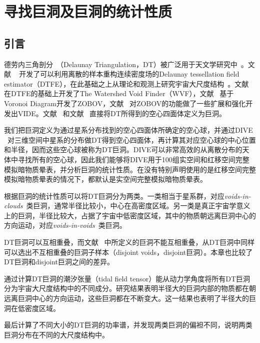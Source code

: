 \chapter{寻找巨洞及巨洞的统计性质}
\label{cha:DIVE}

\section{引言}

德劳内三角剖分~\cite{Delaunay1934}（Delaunay Triangulation，DT）被广泛用于天文学研究中~\cite{Bernardeau1996,Marinoni2002,Pal2006,Cardiel2001,Weygaert2011,Berge2012,Cedres2012}。文献 ~ 开发了可以利用离散的样本重构连续密度场的Delaunay tessellation field estimator（DTFE），在此基础之上从理论和观测上研究宇宙大尺度结构~\cite{Aragon-Calvo2007,Romano-Diaz2007,Weygaert2009,Platen2011,Sousbie2011,Jennings2012}。文献 ~ 在DTFE的基础上开发了The Watershed Void Finder（WVF），文献 ~基于Voronoi Diagram开发了ZOBOV，文献 ~对ZOBOV的功能做了一些扩展和强化开发出VIDE。文献 ~和文献 ~直接将DT所得到的空心四面体定义为巨洞。

我们把巨洞定义为通过星系分布找到的空心四面体所确定的空心球，并通过DIVE ~\cite{Zhao2016DIVE}对三维空间中星系的分布做DT得到空心四面体，再计算其对应空心球的中心位置和半径，因而这些空心球被称为DT巨洞。DIVE可以非常高效的从离散分布的天体中寻找所有的空心球，因此我们能够将DIVE用于100组实空间和红移空间完整模拟暗物质晕表，并分析巨洞的统计性质。在没有特别声明使用的是红移空间完整模拟暗物质晕表的情况下，都默认是实空间完整模拟暗物质晕表。

根据巨洞的统计性质可以将DT巨洞分为两类。一类相当于星系群，对应\textit{voids-in-clouds}~\cite{SW04}类巨洞，通常半径比较小，中心在高密度区域。另一类是真正宇宙学意义上的巨洞，半径比较大，占据了宇宙中低密度区域，其中的物质朝远离巨洞中心的方向运动，对应\textit{voids-in-voids}~\cite{SW04}类巨洞。

DT巨洞可以互相重叠，而文献 ~中所定义的巨洞不能互相重叠，从DT巨洞中同样可以选出不互相重叠的巨洞子样本（disjoint voids，disjoint巨洞）。本章也比较了DT巨洞和disjoint巨洞之间的差异。

通过计算DT巨洞的潮汐张量（tidal field tensor）能从动力学角度将所有DT巨洞分为宇宙大尺度结构中的不同成分。研究结果表明半径大的巨洞内部的物质都在朝远离巨洞中心的方向运动，这些巨洞都在不断变大。这一结果也表明了半径大的巨洞在低密度区域。

最后计算了不同大小的DT巨洞的功率谱，并发现两类巨洞的偏袒不同，说明两类巨洞分布在不同的大尺度结构中。

